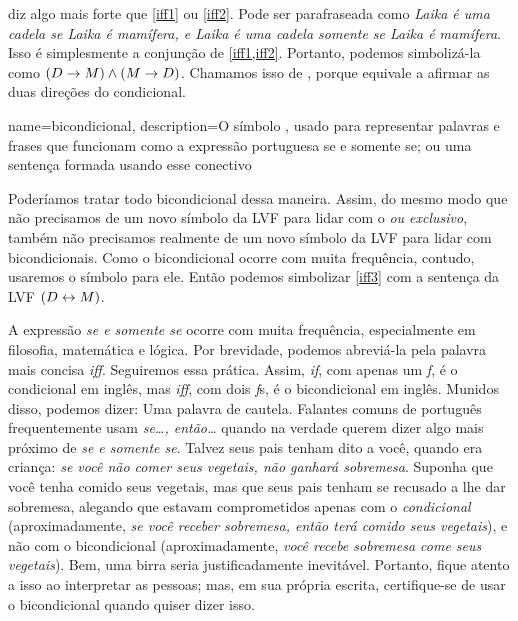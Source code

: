  diz algo mais forte que \cref*{iff1} ou \cref*{iff2}.
Pode ser parafraseada como \emph{Laika é uma cadela se Laika é mamífera,
e Laika é uma cadela somente se Laika é mamífera}. Isso é simplesmente
a conjunção de \cref*{iff1,iff2}. Portanto, podemos simbolizá-la como
$(D \rightarrow M) \wedge (M \rightarrow D)$. Chamamos isso de
, porque equivale a afirmar as duas direções do
condicional.

{
name=bicondicional,
description={O símbolo \eiff, usado para representar palavras e frases que funcionam como a expressão portuguesa se e somente se; ou uma sentença formada usando esse conectivo}
}

Poderíamos tratar todo bicondicional dessa maneira. Assim, do mesmo modo
que não precisamos de um novo símbolo da LVF para lidar com o
\emph{ou exclusivo}, também não precisamos realmente de um novo símbolo
da LVF para lidar com bicondicionais. Como o bicondicional ocorre com
muita frequência, contudo, usaremos o símbolo \eiff para ele. Então
podemos simbolizar \cref*{iff3} com a sentença da LVF $(D \leftrightarrow M)$.

A expressão \emph{se e somente se} ocorre com muita frequência,
especialmente em filosofia, matemática e lógica. Por brevidade, podemos
abreviá-la pela palavra mais concisa \emph{iff}. Seguiremos essa prática.
Assim, \emph{if}, com apenas um \emph{f}, é o condicional em inglês, mas
\emph{iff}, com dois \emph{f}s, é o bicondicional em inglês. Munidos
disso, podemos dizer:
Uma palavra de cautela. Falantes comuns de português frequentemente
usam \emph{se\ldots, então\ldots} quando na verdade querem dizer algo
mais próximo de \emph{se e somente se}. Talvez seus pais tenham dito a
você, quando era criança: \emph{se você não comer seus vegetais, não
ganhará sobremesa}. Suponha que você tenha comido seus vegetais, mas que
seus pais tenham se recusado a lhe dar sobremesa, alegando que estavam
comprometidos apenas com o \emph{condicional} (aproximadamente, \emph{se
você receber sobremesa, então terá comido seus vegetais}), e não com o
bicondicional (aproximadamente, \emph{você recebe sobremesa \ifeff{}
come seus vegetais}). Bem, uma birra seria justificadamente inevitável.
Portanto, fique atento a isso ao interpretar as pessoas; mas, em sua
própria escrita, certifique-se de usar o bicondicional \ifeff{} quando
quiser dizer isso.

